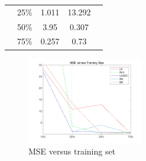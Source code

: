\documentclass{article}
\begin{document}
\begin{table}[H]
\begin{tabular}{|c|c|c|c|c}
        & 25\%                                                    & 1.011                  & 13.292                                                                       &                                                                                                       \\ \cline{1-4}
        & 50\%                                                    & 3.95                   & 0.307                                                                        &                                                                                                       \\ \cline{1-4}
        & 75\%                                                    & 0.257                  & 0.73                                                                         &                                                                                                       \\ \cline{1-4}
    \end{tabular}
    \end{table}

\begin{figure}
    \centering
    \includegraphics[width=0.45\textwidth]{fig/1c-error.png} 
    \caption{MSE versus training set}
\end{figure}
\end{document}
